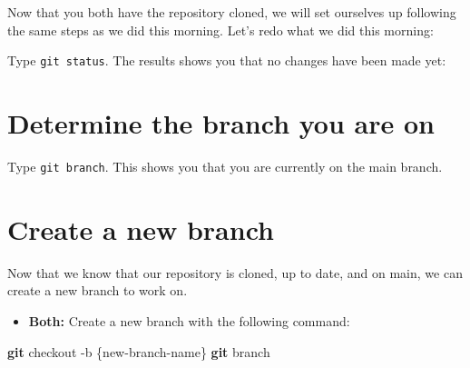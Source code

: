 \documentclass[
]{book}
\newenvironment{Shaded}{\begin{snugshade}}{\end{snugshade}}
\newcommand{\AttributeTok}[1]{\textcolor[rgb]{0.13,0.29,0.53}{#1}}
\newcommand{\ExtensionTok}[1]{#1}
\newcommand{\FunctionTok}[1]{\textcolor[rgb]{0.13,0.29,0.53}{\textbf{#1}}}
\newcommand{\NormalTok}[1]{#1}
\newcommand{\StringTok}[1]{\textcolor[rgb]{0.31,0.60,0.02}{#1}}
\newcommand{\VariableTok}[1]{\textcolor[rgb]{0.00,0.00,0.00}{#1}}
\providecommand{\tightlist}{%
  \setlength{\itemsep}{0pt}\setlength{\parskip}{0pt}}
\begin{document}
Now that you both have the repository cloned, we will set ourselves up following the same steps as we did this morning. Let's redo what we did this morning:

Type \texttt{git\ status}. The results shows you that no changes have been made yet:

\begin{Shaded}
\end{Shaded}

\hypertarget{determine-the-branch-you-are-on}{%
\section{Determine the branch you are on}\label{determine-the-branch-you-are-on}}

Type \texttt{git\ branch}. This shows you that you are currently on the main branch.

\begin{Shaded}
\end{Shaded}

\hypertarget{create-a-new-branch}{%
\section{Create a new branch}\label{create-a-new-branch}}

Now that we know that our repository is cloned, up to date, and on main, we can create a new branch to work on.

\begin{itemize}
\tightlist
\item
  \textbf{Both:} Create a new branch with the following command:
\end{itemize}

\begin{Shaded}
\begin{Highlighting}[]
\FunctionTok{git}\NormalTok{ checkout }\AttributeTok{{-}b}\NormalTok{ \{new{-}branch{-}name\}}
\FunctionTok{git}\NormalTok{ branch}
\end{Highlighting}
\end{Shaded}
\end{document}
